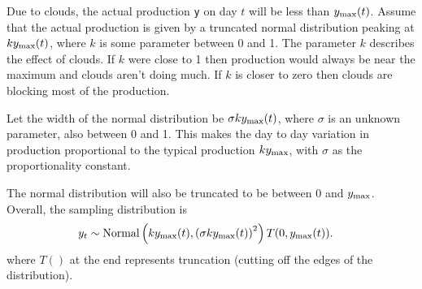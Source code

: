 \documentclass[12pt]{article}
\begin{document}
\begin{Questions}
Due to clouds, the actual production \texttt{y} on day
$t$ will be less than $y_{\rm max}(t)$. Assume that the actual
production is given by a truncated normal distribution peaking at
$ky_{\rm max}(t)$, where $k$ is some parameter between 0 and 1.
The parameter $k$ describes the effect of clouds. If $k$ were close to
1 then production would always be near the maximum and clouds aren't
doing much. If $k$ is closer to zero then clouds are blocking most of
the production.

Let the width of the normal distribution be
$\sigma k y_{\rm max}(t)$, where $\sigma$ is an unknown parameter,
also between 0 and 1. This makes the day to day variation in production
proportional to the typical production $k y_{\rm max}$, with $\sigma$
as the proportionality constant.

The normal distribution will also be truncated to be between
$0$ and $y_{\rm max}$. Overall, the sampling distribution is
\begin{align}
y_t &\sim \textnormal{Normal}
            \left(ky_{\rm max}(t), \left(\sigma k y_{\rm max}(t)\right)^2\right)
            T(0, y_{\rm max}(t)).\label{eqn:likelihood}
\end{align}
where $T()$ at the end represents truncation (cutting off the edges of the
distribution).


\end{Questions}
\end{document}
